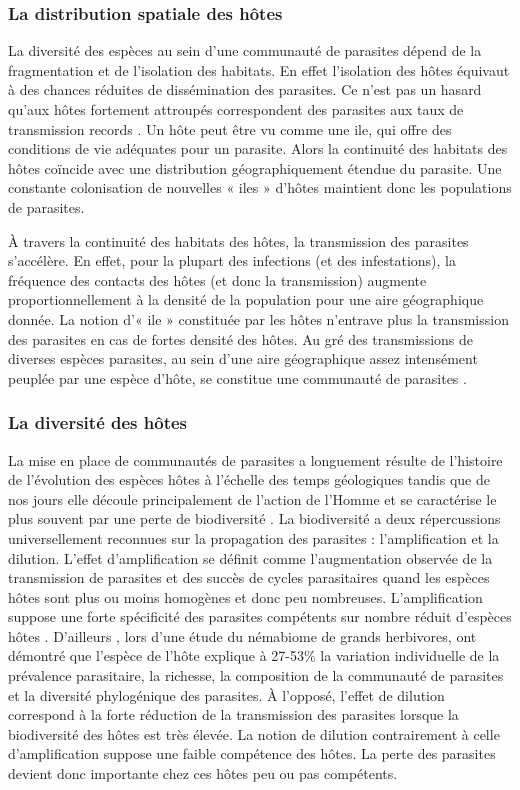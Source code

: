 \subsubsection{La distribution spatiale des hôtes}
La diversité des espèces au sein d'une communauté de parasites dépend de la fragmentation 
et de l'isolation des habitats. En effet l'isolation des hôtes équivaut à des chances 
réduites de dissémination des parasites. Ce n'est pas un hasard qu'aux hôtes fortement 
attroupés correspondent des parasites aux taux de transmission records . 
Un hôte peut être vu comme une ile, qui offre des conditions de vie adéquates pour un 
parasite. Alors la continuité des habitats des hôtes coïncide avec une distribution 
géographiquement étendue du parasite. Une constante colonisation de nouvelles « iles » 
d'hôtes maintient donc les populations de parasites.
\par À travers la continuité des habitats des hôtes, la transmission des parasites 
s'accélère.
En effet, pour la plupart des infections (et des infestations), la fréquence des 
contacts des hôtes (et donc la transmission) augmente proportionnellement à la densité 
de la population pour une aire géographique donnée. La notion d'« ile » constituée par 
les hôtes n'entrave plus la transmission des parasites en cas de fortes densité des 
hôtes. Au gré des transmissions de diverses espèces parasites, au sein d'une aire 
géographique assez intensément peuplée par une espèce d'hôte, se constitue une 
communauté de parasites .

\subsubsection{La diversité des hôtes}
La mise en place de communautés de parasites a longuement résulte de l'histoire de 
l'évolution des espèces hôtes à l'échelle des temps géologiques tandis que de nos 
jours elle découle principalement de l'action de l'Homme et se caractérise le plus 
souvent par une perte de biodiversité . La biodiversité a deux 
répercussions universellement reconnues sur la propagation des parasites : l'amplification 
et la dilution. L'effet d'amplification se définit comme l'augmentation observée de 
la transmission de parasites et des succès de cycles parasitaires quand les espèces 
hôtes sont plus ou moins homogènes et donc peu nombreuses. L'amplification suppose 
une forte spécificité des parasites compétents sur nombre réduit d'espèces hôtes 
. D'ailleurs , lors d'une étude du némabiome de 
grands herbivores, ont démontré que l'espèce de l'hôte explique à 27-53\% la variation 
individuelle de la prévalence parasitaire, la richesse, la composition de la communauté 
de parasites et la diversité phylogénique des parasites. À l'opposé, l'effet de dilution 
correspond à la forte réduction de la transmission des parasites lorsque la biodiversité 
des hôtes est très élevée. La notion de dilution contrairement à celle d'amplification 
suppose une faible compétence des hôtes. La perte des parasites devient donc importante 
chez ces hôtes peu ou pas compétents.

